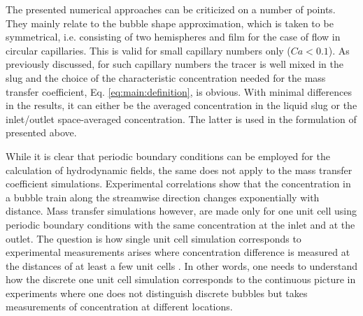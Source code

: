 \documentclass[preprint,12pt]{elsarticle}
\begin{document}
The presented numerical approaches \cite{vanbaten-circular,kreutzer-overview}
can be criticized on a number of points. They mainly
relate to the bubble shape approximation, which is taken to be symmetrical, i.e.
consisting of two hemispheres and film for the case of flow in circular
capillaries. This is valid  for small capillary numbers only ($Ca<0.1$). As previously
discussed, for such capillary numbers the tracer is well mixed in the slug and 
the choice of the characteristic concentration needed for the mass transfer
coefficient, Eq. \ref{eq:main:definition}, is obvious. With minimal
differences in the results, it can either be the averaged concentration in the liquid slug
or the inlet/outlet space-averaged concentration. The latter is used in the formulation
of \citet{vanbaten-circular} presented above. 

While it is clear that periodic boundary conditions can be employed for the calculation
 of hydrodynamic fields, the same does not apply to the mass transfer coefficient
simulations. Experimental correlations \cite{bercic-mass} show that the
concentration in a bubble train along the streamwise direction changes exponentially with distance.
Mass transfer simulations however, are made only for one unit cell
using periodic boundary conditions with the same concentration at the inlet
and at the outlet. The question is how single unit cell simulation corresponds to
experimental measurements arises where concentration difference is measured at
the distances of at least a few unit cells \cite{bercic-mass}. In
other words, one needs to understand how the discrete one unit cell simulation
corresponds to the continuous picture in experiments where one does not
distinguish discrete bubbles but takes measurements of concentration at different
locations.
\end{document}
